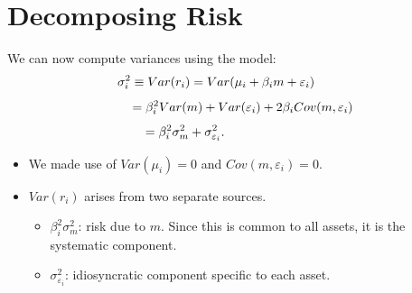 \documentclass[letterpaper,10pt,english]{sphinxmanual}
\begin{document}
\section{Decomposing Risk}
\label{indexModels:decomposing-risk}
We can now compute variances using the model:
\begin{gather}
\begin{split}\sigma^2_i & \equiv Var(r_i) = Var(\mu_i + \beta_i m +
\varepsilon_i) \qquad\end{split}\notag
\end{gather}\begin{gather}
\begin{split}& \qquad = \beta^2_i Var(m) + Var(\varepsilon_i) + 2\beta_iCov(m,\varepsilon_i)\end{split}\notag
\end{gather}\begin{gather}
\begin{split}& = \beta^2_i \sigma^2_m + \sigma^2_{\varepsilon_i}. \qquad \qquad
\qquad \quad \,\end{split}\notag
\end{gather}\begin{itemize}
\item {} 
We made use of $Var(\mu_i) = 0$ and $Cov(m,\varepsilon_i) = 0$.

\end{itemize}
\begin{itemize}
\item {} 
$Var(r_i)$ arises from two separate sources.
\begin{itemize}
\item {} 
$\beta^2_i \sigma^2_m$: risk due to $m$. Since this is common to
all assets, it is the systematic component.

\end{itemize}
\begin{itemize}
\item {} 
$\sigma^2_{\varepsilon_i}$: idiosyncratic component specific to each
asset.

\end{itemize}

\end{itemize}
\end{document}
